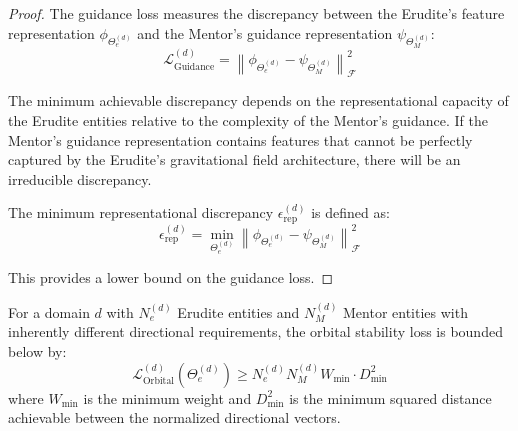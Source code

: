 \begin{proof}
The guidance loss measures the discrepancy between the Erudite's feature representation $\phi_{\Theta_e^{(d)}}$ and the Mentor's guidance representation $\psi_{\Theta_M^{(d)}}$:
\begin{equation}
\mathcal{L}_{\text{Guidance}}^{(d)} = \left\|\phi_{\Theta_e^{(d)}} - \psi_{\Theta_M^{(d)}}\right\|^2_{\mathcal{F}}
\end{equation}

The minimum achievable discrepancy depends on the representational capacity of the Erudite entities relative to the complexity of the Mentor's guidance. If the Mentor's guidance representation contains features that cannot be perfectly captured by the Erudite's gravitational field architecture, there will be an irreducible discrepancy.

The minimum representational discrepancy $\epsilon_{\text{rep}}^{(d)}$ is defined as:
\begin{equation}
\epsilon_{\text{rep}}^{(d)} = \min_{\Theta_e^{(d)}} \left\|\phi_{\Theta_e^{(d)}} - \psi_{\Theta_M^{(d)}}\right\|^2_{\mathcal{F}}
\end{equation}

This provides a lower bound on the guidance loss.
\end{proof}

\begin{theorem}
For a domain $d$ with $N_e^{(d)}$ Erudite entities and $N_M^{(d)}$ Mentor entities with inherently different directional requirements, the orbital stability loss is bounded below by:
\begin{equation}
\mathcal{L}_{\text{Orbital}}^{(d)}(\Theta_e^{(d)}) \geq N_e^{(d)}N_M^{(d)}W_{\text{min}} \cdot D_{\text{min}}^2
\end{equation}
where $W_{\text{min}}$ is the minimum weight and $D_{\text{min}}^2$ is the minimum squared distance achievable between the normalized directional vectors.
\end{theorem}

